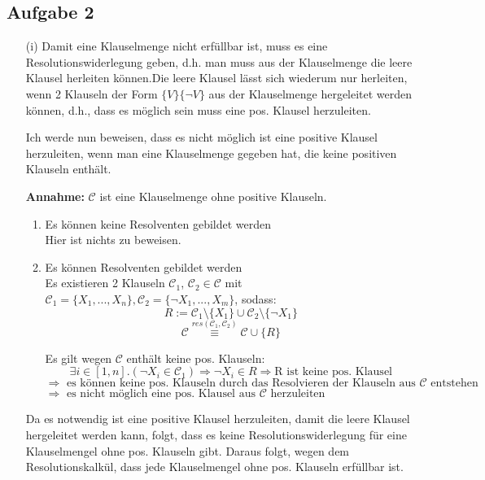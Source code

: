 \documentclass[a4paper,10pt]{article}
\begin{document}
	\subsection*{Aufgabe 2}
	\begin{enumerate}
	\item[(i)]
	Damit eine Klauselmenge nicht erfüllbar ist, muss es eine Resolutionswiderlegung geben, d.h. man muss aus der Klauselmenge die leere Klausel herleiten können.Die leere Klausel lässt sich wiederum  nur herleiten, wenn 2 Klauseln der Form $\{ V \} \{ \neg V \}$ aus der
	Klauselmenge hergeleitet werden können, d.h., dass es möglich sein muss eine pos. Klausel herzuleiten.
	
	Ich werde nun beweisen, dass es nicht möglich ist eine positive Klausel herzuleiten, wenn man eine Klauselmenge gegeben hat, 
	die keine positiven Klauseln enthält.
	
	\textbf{Annahme: }$\mathcal{C}$ ist eine Klauselmenge ohne positive Klauseln.
	\begin{enumerate}
	\item Es können keine Resolventen gebildet werden \\
	Hier ist nichts zu beweisen.
	
	\item Es können Resolventen gebildet werden \\
	Es existieren 2 Klauseln $\mathcal{C}_1$, $\mathcal{C}_2 \in \mathcal{C}$ 
	mit $\mathcal{C}_1 = \{ X_1,...,X_n \},\mathcal{C}_2 = \{ \neg X_1,...,X_m \} $, sodass:\\
	
	\[R := \mathcal{C}_1 \setminus{ \{ X_1 \} } \cup \mathcal{C}_2 \setminus{ \{ \neg X_1 \} } \]
	\[ \mathcal{C} \overset{res(\mathcal{C}_1,\mathcal{C}_2)}{\equiv} \mathcal{C} \cup \{ R \} \]
	
	Es gilt wegen $\mathcal{C}$ enthält keine pos. Klauseln: 
	\[\exists i \in [1,n].(\neg X_i \in \mathcal{C}_1) \Rightarrow \neg X_i \in R \Rightarrow \text{R ist keine pos. Klausel}\]
	$\Rightarrow \text{ es können keine pos. Klauseln durch das Resolvieren der Klauseln aus $\mathcal{C}$ entstehen}$ \\
	$\Rightarrow \text{ es nicht möglich eine pos. Klausel aus $\mathcal{C}$ herzuleiten}$\\
	\end{enumerate}
	
	Da es notwendig ist eine positive Klausel herzuleiten, damit die leere Klausel hergeleitet werden kann,
	folgt, dass es keine Resolutionswiderlegung für eine Klauselmengel ohne pos. Klauseln gibt. 
	Daraus folgt, wegen dem Resolutionskalkül, dass jede Klauselmengel ohne pos. Klauseln erfüllbar ist.
	

\end{enumerate}
\end{document}
